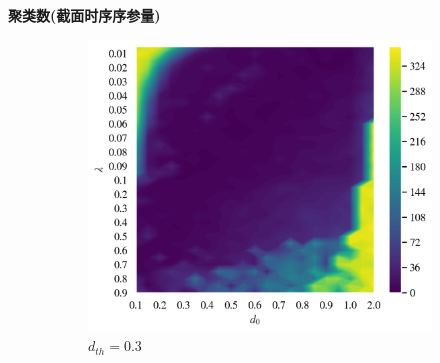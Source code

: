 \documentclass{article}
\begin{document}
\newpage
\noindent\textbf{聚类数(截面时序序参量)}

\begin{figure}[H]
	\centering
	\begin{subfigure}[b]{0.49\textwidth}
		\includegraphics[width=\textwidth]{./figs/classNum1.png}
		\vspace{-1cm}
		\caption{$d_{th}=0.3$}
	\end{subfigure}
	\begin{subfigure}[b]{0.49\textwidth}

\end{subfigure}
\end{figure}
\end{document}

